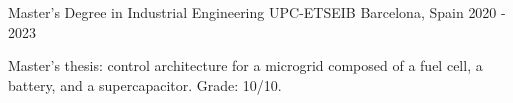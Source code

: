 \cventry
  {Master's Degree in Industrial Engineering}
  {UPC-ETSEIB}
  {Barcelona, Spain}
  {2020 - 2023}
  {
    \begin{cvitems}
      \item {Master's thesis: control architecture for a microgrid composed of a fuel cell, a battery, and a supercapacitor. Grade: 10/10.}
    \end{cvitems}
  }
